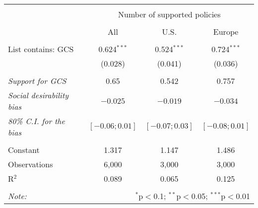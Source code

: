 
\begin{tabular}{@{\extracolsep{5pt}}lccc} 
\\[-1.8ex]\hline 
\hline \\[-1.8ex] 
 & \multicolumn{3}{c}{Number of supported policies} \\ 
\cline{2-4} 
\\[-1.8ex] & All & U.S. & Europe \\ 
\hline \\[-1.8ex] 
 List contains: GCS & 0.624$^{***}$ & 0.524$^{***}$ & 0.724$^{***}$ \\ 
  & (0.028) & (0.041) & (0.036) \\ 
\hline  \\[-1.8ex] \textit{Support for GCS} & 0.65  &  0.542  &  0.757 \\
\textit{Social desirability bias} & \textit{$ -0.025 $} & \textit{$ -0.019 $} & \textit{$ -0.034 $}\\
\textit{80\% C.I. for the bias} & \textit{ $[ -0.06 ; 0.01 ]$ } & \textit{ $[ -0.07 ; 0.03 ]$} & \textit{ $[ -0.08 ; 0.01 ]$}\\
 \hline \\[-1.8ex] 
Constant & 1.317 & 1.147 & 1.486 \\ 
Observations & 6,000 & 3,000 & 3,000 \\ 
R$^{2}$ & 0.089 & 0.065 & 0.125 \\ 
\hline 
\hline \\[-1.8ex] 
\textit{Note:}  & \multicolumn{3}{r}{$^{*}$p$<$0.1; $^{**}$p$<$0.05; $^{***}$p$<$0.01} \\ 
\end{tabular} 